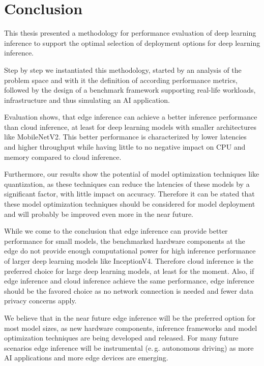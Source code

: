 \chapter{Conclusion}
\label{chap:conclusion}
%
This thesis presented a methodology for performance evaluation of deep learning inference to support the optimal selection of deployment options for deep learning inference.

Step by step we instantiated this methodology, started by an analysis of the problem space and with it the definition of according performance metrics, followed by the design of a benchmark framework supporting real-life workloads, infrastructure and thus simulating an AI application.

Evaluation shows, that edge inference can achieve a better inference performance than cloud inference, at least for deep learning models with smaller architectures like MobileNetV2.
This better performance is characterized by lower latencies and higher throughput while having little to no negative impact on CPU and memory compared to cloud inference.

Furthermore, our results show the potential of model optimization techniques like quantization, as these techniques can reduce the latencies of these models by a significant factor, with little impact on accuracy.
Therefore it can be stated that these model optimization techniques should be considered for model deployment and will probably be improved even more in the near future.

While we come to the conclusion that edge inference can provide better performance for small models, the benchmarked hardware components at the edge do not provide enough computational power for high inference performance of larger deep learning models like InceptionV4.
Therefore cloud inference is the preferred choice for large deep learning models, at least for the moment.
Also, if edge inference and cloud inference achieve the same performance, edge inference should be the favored choice as no network connection is needed and fewer data privacy concerns apply.

We believe that in the near future edge inference will be the preferred option for most model sizes, as new hardware components, inference frameworks and model optimization techniques are being developed and released.
For many future scenarios edge inference will be instrumental (e.\,g. autonomous driving) as more AI applications and more edge devices are emerging.


